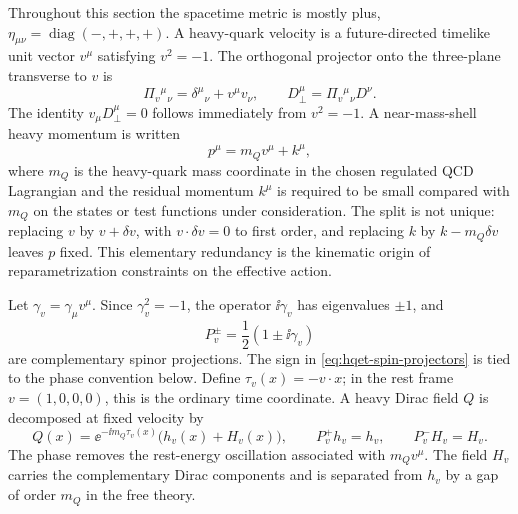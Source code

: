 Throughout this section the spacetime metric is mostly plus,
\(\eta_{\mu\nu}=\operatorname{diag}(-,+,+,+)\).  A heavy-quark velocity is a
future-directed timelike unit vector \(v^\mu\) satisfying \(v^2=-1\).  The
orthogonal projector onto the three-plane transverse to \(v\) is
\begin{equation}
  \Pi_v{}^\mu{}_\nu=\delta^\mu{}_\nu+v^\mu v_\nu,
  \qquad
  D_\perp^\mu=\Pi_v{}^\mu{}_\nu D^\nu .
  \label{eq:hqet-transverse-projector}
\end{equation}
The identity \(v_\mu D_\perp^\mu=0\) follows immediately from \(v^2=-1\).  A
near-mass-shell heavy momentum is written
\begin{equation}
  p^\mu=m_Qv^\mu+k^\mu ,
  \label{eq:hqet-momentum-split}
\end{equation}
where \(m_Q\) is the heavy-quark mass coordinate in the chosen regulated QCD
Lagrangian and the residual momentum \(k^\mu\) is required to be small
compared with \(m_Q\) on the states or test functions under consideration.
The split is not unique: replacing \(v\) by \(v+\delta v\), with
\(v\cdot\delta v=0\) to first order, and replacing \(k\) by \(k-m_Q\delta v\)
leaves \(p\) fixed.  This elementary redundancy is the kinematic origin of
reparametrization constraints on the effective action.

Let \(\gamma_v=\gamma_\mu v^\mu\).  Since \(\gamma_v^2=-1\), the operator
\(\ii\gamma_v\) has eigenvalues \(\pm1\), and
\begin{equation}
  P_v^\pm=\frac12(1\pm\ii\gamma_v)
  \label{eq:hqet-spin-projectors}
\end{equation}
are complementary spinor projections.  The sign in
\eqref{eq:hqet-spin-projectors} is tied to the phase convention below.  Define
\(\tau_v(x)=-v\cdot x\); in the rest frame \(v=(1,0,0,0)\), this is the
ordinary time coordinate.  A heavy Dirac field \(Q\) is decomposed at fixed
velocity by
\begin{equation}
  Q(x)=\ee^{-\ii m_Q\tau_v(x)}\bigl(h_v(x)+H_v(x)\bigr),
  \qquad
  P_v^+h_v=h_v,\qquad P_v^-H_v=H_v .
  \label{eq:hqet-field-split}
\end{equation}
The phase removes the rest-energy oscillation associated with \(m_Qv^\mu\).
The field \(H_v\) carries the complementary Dirac components and is separated
from \(h_v\) by a gap of order \(m_Q\) in the free theory.

